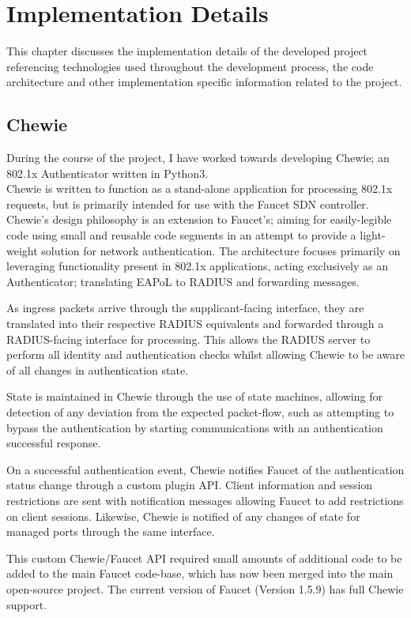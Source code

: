 \chapter{Implementation Details}\label{chap:implementation_details}
This chapter discusses the implementation details of the developed project referencing technologies used throughout the development process, the code architecture and other implementation specific information related to the project. 

\section{Chewie}
During the course of the project, I have worked towards developing Chewie; an 802.1x Authenticator written in Python3. \\
Chewie is written to function as a stand-alone application for processing 802.1x requests, but is primarily intended for use with the Faucet SDN controller.\\
Chewie's design philosophy is an extension to Faucet's; aiming for easily-legible code using small and reusable code segments in an attempt to provide a light-weight solution for network authentication.
The architecture focuses primarily on leveraging functionality present in 802.1x applications, acting exclusively as an Authenticator; translating EAPoL to RADIUS and forwarding messages.

As ingress packets arrive through the supplicant-facing interface, they are translated into their respective RADIUS equivalents and forwarded through a RADIUS-facing interface for processing. This allows the RADIUS server to perform all identity and authentication checks whilst allowing Chewie to be aware of all changes in authentication state.

State is maintained in Chewie through the use of state machines, allowing for detection of any deviation from the expected packet-flow, such as attempting to bypass the authentication by starting communications with an authentication successful response.

On a successful authentication event, Chewie notifies Faucet of the authentication status change through a custom plugin API. Client information and session restrictions are sent with notification messages allowing Faucet to add restrictions on client sessions. 
Likewise, Chewie is notified of any changes of state for managed ports through the same interface.

This custom Chewie/Faucet API required small amounts of additional code to be added to the main Faucet code-base, which has now been merged into the main open-source project\cite{faucet_github}. The current version of Faucet (Version 1.5.9) has full Chewie support. 


